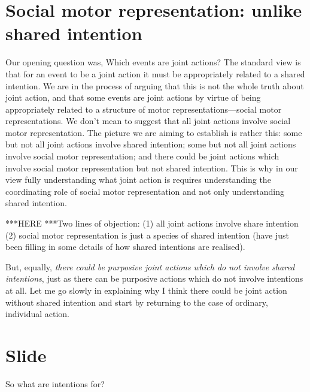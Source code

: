 \documentclass[12pt,\papersize]{extarticle}
\begin{document}
\section{Social motor representation: unlike shared intention}
Our opening question was, Which events are joint actions?
The standard view is that for an event to be a joint action it must be appropriately related to a shared intention.
We are in the process of arguing that this is not the whole truth about joint action,
and that some events are joint actions by virtue of being appropriately related to a structure of motor representations---social motor representations.
We don’t mean to suggest that all joint actions involve social motor representation.
The picture we are aiming to establish is rather this: some but not all joint actions involve shared intention; some but not all joint actions involve social motor representation; and there could be joint actions which involve social motor representation but not shared intention.
This is why in our view 
fully understanding what joint action is requires understanding the coordinating role of social motor representation and not only understanding shared intention.

***HERE
***Two lines of objection:
(1) all joint actions involve share intention
(2) social motor representation is just a species of shared intention (have just been filling in some details of how shared intentions are realised).

But, equally, \emph{there could be purposive joint actions which do not involve shared intentions},
just as there can be purposive actions which do not involve intentions at all.
Let me go slowly in explaining why I think there could be joint action without shared intention and start by returning to the case of ordinary, individual action.




\section{Slide}
So what are intentions for?
\end{document}
